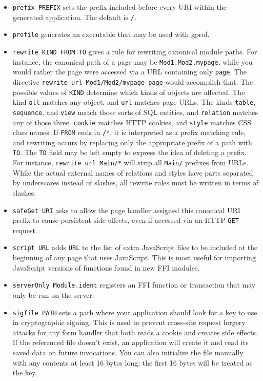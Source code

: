 \documentclass{article}
\newcommand{\cd}[1]{\texttt{#1}}
\begin{document}
\begin{itemize}
\item \texttt{prefix PREFIX} sets the prefix included before every URI within the generated application.  The default is \texttt{/}.
\item \texttt{profile} generates an executable that may be used with gprof.
\item \texttt{rewrite KIND FROM TO} gives a rule for rewriting canonical module paths.  For instance, the canonical path of a page may be \texttt{Mod1.Mod2.mypage}, while you would rather the page were accessed via a URL containing only \texttt{page}.  The directive \texttt{rewrite url Mod1/Mod2/mypage page} would accomplish that.  The possible values of \texttt{KIND} determine which kinds of objects are affected.  The kind \texttt{all} matches any object, and \texttt{url} matches page URLs.  The kinds \texttt{table}, \texttt{sequence}, and \texttt{view} match those sorts of SQL entities, and \texttt{relation} matches any of those three.  \texttt{cookie} matches HTTP cookies, and \texttt{style} matches CSS class names.  If \texttt{FROM} ends in \texttt{/*}, it is interpreted as a prefix matching rule, and rewriting occurs by replacing only the appropriate prefix of a path with \texttt{TO}.  The \texttt{TO} field may be left empty to express the idea of deleting a prefix.  For instance, \texttt{rewrite url Main/*} will strip all \texttt{Main/} prefixes from URLs.  While the actual external names of relations and styles have parts separated by underscores instead of slashes, all rewrite rules must be written in terms of slashes.
\item \texttt{safeGet URI} asks to allow the page handler assigned this canonical URI prefix to cause persistent side effects, even if accessed via an HTTP \cd{GET} request.
\item \texttt{script URL} adds \texttt{URL} to the list of extra JavaScript files to be included at the beginning of any page that uses JavaScript.  This is most useful for importing JavaScript versions of functions found in new FFI modules.
\item \texttt{serverOnly Module.ident} registers an FFI function or transaction that may only be run on the server.
\item \texttt{sigfile PATH} sets a path where your application should look for a key to use in cryptographic signing.  This is used to prevent cross-site request forgery attacks for any form handler that both reads a cookie and creates side effects.  If the referenced file doesn't exist, an application will create it and read its saved data on future invocations.  You can also initialize the file manually with any contents at least 16 bytes long; the first 16 bytes will be treated as the key.

\end{itemize}
\end{document}
